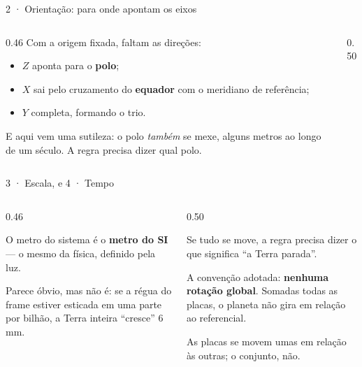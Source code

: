 \documentclass[aspectratio=169,11pt]{beamer}
\newcommand{\bnum}[1]{\textbf{\textcolor{mTeal}{#1}}}
\begin{document}
\begin{frame}{2 · Orientação: para onde apontam os eixos}
  \begin{columns}[T]
    \begin{column}{0.46\textwidth}
      Com a origem fixada, faltam as direções:
      \begin{itemize}
        \item $Z$ aponta para o \bnum{polo};
        \item $X$ sai pelo cruzamento do \bnum{equador} com o meridiano de referência;
        \item $Y$ completa, formando o trio.
      \end{itemize}
      \medskip
      {\small E aqui vem uma sutileza: o polo \emph{também} se mexe, alguns metros ao longo
      de um século. A regra precisa dizer qual polo.}
    \end{column}
    \begin{column}{0.50\textwidth}
      \centering
    \end{column}
  \end{columns}
\end{frame}

\begin{frame}{3 · Escala, e 4 · Tempo}
  \begin{columns}[T]
    \begin{column}{0.46\textwidth}
      \begin{regra}[title={3 · Escala}]
        O metro do sistema é o \bnum{metro do SI} --- o mesmo da física, definido pela luz.
        \medskip

        Parece óbvio, mas não é: se a régua do frame estiver esticada em uma parte por
        bilhão, a Terra inteira ``cresce'' 6\,mm.
      \end{regra}
    \end{column}
    \begin{column}{0.50\textwidth}
      \begin{regra}[title={4 · Tempo}]
        Se tudo se move, a regra precisa dizer o que significa ``a Terra parada''.
        \medskip

        A convenção adotada: \bnum{nenhuma rotação global}. Somadas todas as placas, o
        planeta não gira em relação ao referencial.
        \medskip

        {\small As placas se movem umas em relação às outras; o conjunto, não.}
      \end{regra}
    \end{column}
  \end{columns}
\end{frame}
\end{document}
